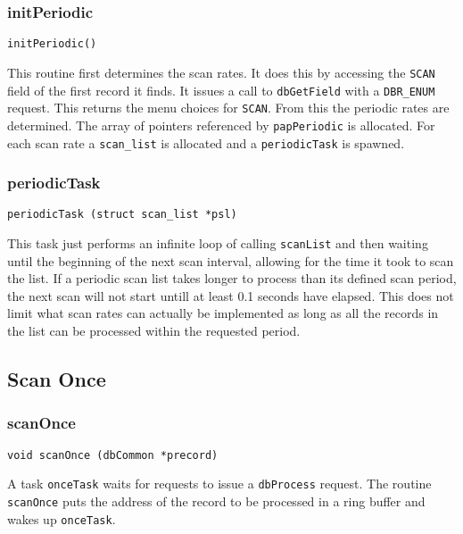 \subsubsection{initPeriodic}

\begin{verbatim}initPeriodic()
\end{verbatim}This routine first determines the scan rates. It does this by accessing the \verb|SCAN| field of the first record it finds. It issues a 
call to \verb|dbGetField| with a \verb|DBR_ENUM| request. This returns the menu choices for \verb|SCAN|. From this the periodic rates are 
determined. The array of pointers referenced by \verb|papPeriodic| is allocated. For each scan rate a \verb|scan_list| is 
allocated and a \verb|periodicTask| is spawned.

\subsubsection{periodicTask}

\begin{verbatim}periodicTask (struct scan_list *psl)
\end{verbatim}This task just performs an infinite loop of calling \verb|scanList| and then waiting until the beginning of the next scan 
interval, allowing for the time it took to scan the list. If a periodic scan list takes longer to process than its defined scan 
period, the next scan will not start untill at least 0.1 seconds have elapsed.  This does not limit what scan rates can actually 
be implemented as long as all the records in the list can be processed within the requested period.

\subsection{Scan Once}

\subsubsection{scanOnce}

\begin{verbatim}void scanOnce (dbCommon *precord)
\end{verbatim}A task \verb|onceTask| waits for requests to issue a \verb|dbProcess| request. The routine \verb|scanOnce| puts the address of the 
record to be processed in a ring buffer and wakes up \verb|onceTask|.

